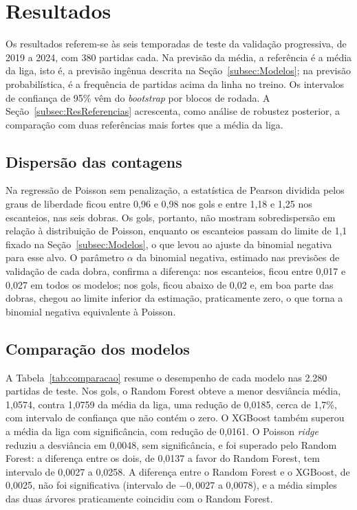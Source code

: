 \section{Resultados}\label{sec:Results}

Os resultados referem-se às seis temporadas de teste da validação progressiva, de 2019 a 2024, com 380 partidas cada. Na previsão da média, a referência é a média da liga, isto é, a previsão ingênua descrita na Seção~\ref{subsec:Modelos}; na previsão probabilística, é a frequência de partidas acima da linha no treino. Os intervalos de confiança de 95\% vêm do \textit{bootstrap} por blocos de rodada. A Seção~\ref{subsec:ResReferencias} acrescenta, como análise de robustez posterior, a comparação com duas referências mais fortes que a média da liga.

\subsection{Dispersão das contagens}\label{subsec:ResDispersao}

Na regressão de Poisson sem penalização, a estatística de Pearson dividida pelos graus de liberdade ficou entre 0,96 e 0,98 nos gols e entre 1,18 e 1,25 nos escanteios, nas seis dobras. Os gols, portanto, não mostram sobredispersão em relação à distribuição de Poisson, enquanto os escanteios passam do limite de 1,1 fixado na Seção~\ref{subsec:Modelos}, o que levou ao ajuste da binomial negativa para esse alvo. O parâmetro $\alpha$ da binomial negativa, estimado nas previsões de validação de cada dobra, confirma a diferença: nos escanteios, ficou entre 0,017 e 0,027 em todos os modelos; nos gols, ficou abaixo de 0,02 e, em boa parte das dobras, chegou ao limite inferior da estimação, praticamente zero, o que torna a binomial negativa equivalente à Poisson.

\subsection{Comparação dos modelos}\label{subsec:ResComparacao}

A Tabela~\ref{tab:comparacao} resume o desempenho de cada modelo nas 2.280 partidas de teste. Nos gols, o Random Forest obteve a menor desviância média, 1,0574, contra 1,0759 da média da liga, uma redução de 0,0185, cerca de 1,7\%, com intervalo de confiança que não contém o zero. O XGBoost também superou a média da liga com significância, com redução de 0,0161. O Poisson \textit{ridge} reduziu a desviância em 0,0048, sem significância, e foi superado pelo Random Forest: a diferença entre os dois, de 0,0137 a favor do Random Forest, tem intervalo de 0,0027 a 0,0258. A diferença entre o Random Forest e o XGBoost, de 0,0025, não foi significativa (intervalo de $-0{,}0027$ a 0,0078), e a média simples das duas árvores praticamente coincidiu com o Random Forest.

